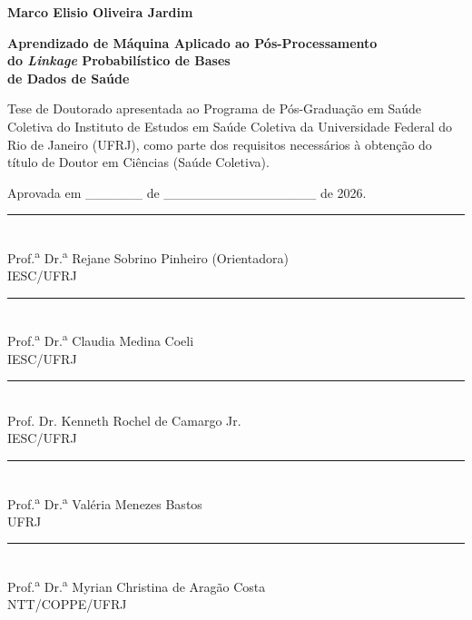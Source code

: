 \documentclass[12pt,a4paper,openany]{book}
\begin{document}
\newpage

\thispagestyle{empty}

\noindent
\setlength{\headheight}{15pt}

\begin{center}

{\large \bf Marco Elisio Oliveira Jardim}

\vspace{20pt}

{\Large \bf Aprendizado de M\'aquina Aplicado ao P\'os-Processamento\\do \textit{Linkage} Probabil\'istico de Bases\\de Dados de Sa\'ude}

\vspace{25pt}

\parbox{12cm}{\centering Tese de Doutorado apresentada ao Programa de P\'os-Gradua\c{c}\~ao em Sa\'ude Coletiva do Instituto de Estudos em Sa\'ude Coletiva da Universidade Federal do Rio de Janeiro (UFRJ), como parte dos requisitos necess\'arios \`a obten\c{c}\~ao do t\'itulo de Doutor em Ci\^encias (Sa\'ude Coletiva).}

\vspace{25pt}

Aprovada em \_\_\_\_\_\_ de \_\_\_\_\_\_\_\_\_\_\_\_\_\_\_\_ de 2026.

\end{center}

\vspace{35pt}

\begin{center}
\rule{10cm}{0.5pt}\\
Prof.\textsuperscript{a} Dr.\textsuperscript{a} Rejane Sobrino Pinheiro (Orientadora)\\
IESC/UFRJ

\vspace{25pt}

\rule{10cm}{0.5pt}\\
Prof.\textsuperscript{a} Dr.\textsuperscript{a} Claudia Medina Coeli\\
IESC/UFRJ

\vspace{25pt}

\rule{10cm}{0.5pt}\\
Prof. Dr. Kenneth Rochel de Camargo Jr.\\
IESC/UFRJ

\vspace{25pt}

\rule{10cm}{0.5pt}\\
Prof.\textsuperscript{a} Dr.\textsuperscript{a} Valéria Menezes Bastos\\
UFRJ

\vspace{25pt}

\rule{10cm}{0.5pt}\\
Prof.\textsuperscript{a} Dr.\textsuperscript{a} Myrian Christina de Aragão Costa\\
NTT/COPPE/UFRJ

\end{center}
\end{document}
